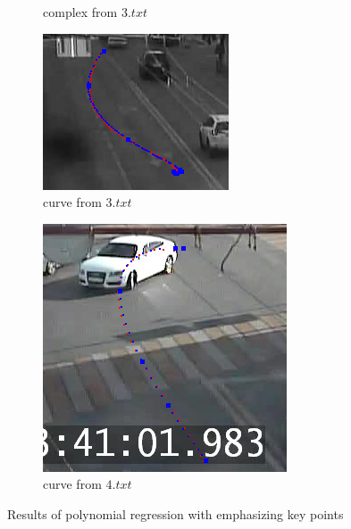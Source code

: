 \begin{figure}[!htb]
\begin{subfigure}[!htb]{0.3\textwidth}
		\caption{complex from $3.txt$}
	\end{subfigure}
	\hfill
	\begin{subfigure}[!htb]{0.3\textwidth}
		\centering{}
		\includegraphics[width=\textwidth]{images/regr_kp_curve_3.png}
		\caption{curve from $3.txt$}
	\end{subfigure}
	\hfill
	\begin{subfigure}[!htb]{0.3\textwidth}
		\centering{}
		\includegraphics[width=\textwidth]{images/regr_kp_curve_4.png}
		\caption{curve from $4.txt$}
	\end{subfigure}
	
	\caption{Results of polynomial regression with emphasizing key points}
	\label{fig:regr-kp111}
\end{figure}

